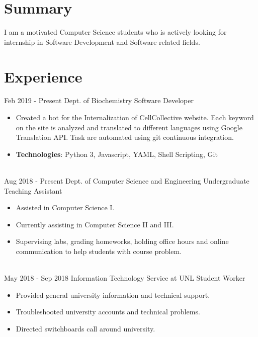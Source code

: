 \documentclass[letterpaper]{twentysecondcv} %
\begin{document}
\makeprofile %
 \section{Summary}
    I am a motivated Computer Science students who is actively looking for internship in Software Development and Software related fields.

\section{Experience}



\begin{twenty} %
\twentyitem
    	{Feb 2019 -}
    	{Present}
        {Dept. of Biochemistry}
        {}
        {Software Developer}
        {\begin{itemize}
            \item Created a bot for the Internalization of CellCollective website. Each keyword on the site is analyzed and translated to different languages using Google Translation API. Task are automated using git continuous integration.
            \item \textbf{Technologies}: Python 3, Javascript, YAML, Shell Scripting, Git
        \end{itemize}
        }
        \\
\twentyitem
    	{Aug 2018 -}
		{Present}
        {Dept. of Computer Science and Engineering}
        {}
        {Undergraduate Teaching Assistant}
        {\begin{itemize}
        \item Assisted in Computer Science I.
        \item Currently assisting in Computer Science II and III.
        \item Supervising labs, grading homeworks, holding office hours and online communication to help students with course problem.
        \end{itemize}
        }
        \\
\twentyitem
	{May 2018 -}
	{Sep 2018}
    {Information Technology Service at UNL}
    {}
    {Student Worker}
    {
    {\begin{itemize}
    \item Provided general university information and technical support.
    \item Troubleshooted university accounts and technical problems.
    \item Directed switchboards call around university.
    \end{itemize}}
    }
    
        
\end{twenty}
\end{document}
